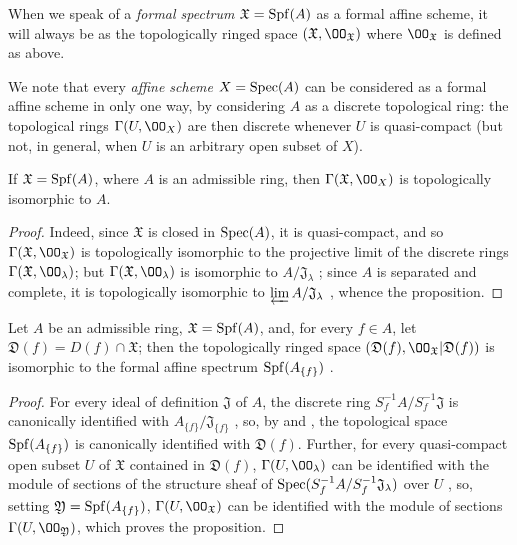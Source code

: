 When we speak of a \emph{formal spectrum $\mathfrak{X}=\operatorname{Spf}(A)$} as a formal affine scheme, it will always be as the topologically ringed space $(\mathfrak{X},\OO_\mathfrak{X})$ where $\OO_\mathfrak{X}$ is defined as above.

We note that every \emph{affine scheme} $X=\operatorname{Spec}(A)$ can be considered as a formal affine scheme in only one way, by considering $A$ as a discrete topological ring: the topological rings $\Gamma(U,\OO_X)$ are then discrete whenever $U$ is quasi-compact (but not, in general, when $U$ is an arbitrary open subset of $X$).

\begin{prop}[10.1.3]
\label{1.10.1.3}
If $\mathfrak{X}=\operatorname{Spf}(A)$, where $A$ is an admissible ring, then $\Gamma(\mathfrak{X},\OO_X)$ is topologically isomorphic to $A$.
\end{prop}

\begin{proof}
\label{proof-1.10.1.3}
Indeed, since $\mathfrak{X}$ is closed in $\operatorname{Spec}(A)$, it is quasi-compact, and so $\Gamma(\mathfrak{X},\OO_\mathfrak{X})$ is topologically isomorphic to the projective limit of the discrete rings $\Gamma(\mathfrak{X},\OO_\lambda)$; but $\Gamma(\mathfrak{X},\OO_\lambda)$ is isomorphic to $A/\mathfrak{J}_\lambda$ ; since $A$ is separated and complete, it is topologically isomorphic to $\varprojlim A/\mathfrak{J}_\lambda$ , whence the proposition.
\end{proof}

\begin{prop}[10.1.4]
\label{1.10.1.4}
Let $A$ be an admissible ring, $\mathfrak{X}=\operatorname{Spf}(A)$, and, for every $f\in A$, let $\mathfrak{D}(f)=D(f)\cap\mathfrak{X}$; then the topologically ringed space $(\mathfrak{D}(f),\OO_\mathfrak{X}|\mathfrak{D}(f))$ is isomorphic to the formal affine spectrum $\operatorname{Spf}(A_{\{f\}})$ .
\end{prop}

\begin{proof}
\label{proof-1.10.1.4}
For every ideal of definition $\mathfrak{J}$ of $A$, the discrete ring $S_f^{-1}A/ S_f^{-1}\mathfrak{J}$ is canonically identified with $A_{\{f\}}/\mathfrak{J}_{\{f\}}$ , so, by  and , the topological space $\operatorname{Spf}(A_{\{f\}})$ is canonically identified with $\mathfrak{D}(f)$.
Further, for every quasi-compact open subset $U$ of $\mathfrak{X}$ contained in $\mathfrak{D}(f)$, $\Gamma(U,\OO_\lambda)$ can be identified with the module of sections of the structure sheaf of $\operatorname{Spec}(S_f^{-1}A/ S_f^{-1}\mathfrak{J}_\lambda)$ over $U$ , so, setting $\mathfrak{Y}=\operatorname{Spf}(A_{\{f\}})$, $\Gamma(U,\OO_\mathfrak{X})$ can be identified with the module of sections $\Gamma(U,\OO_\mathfrak{Y})$, which proves the proposition.
\end{proof}

